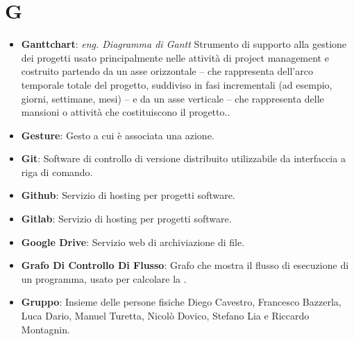 \section{G}
\begin{itemize}
	\item
	\textbf{Ganttchart}: \textit{eng. Diagramma di Gantt} Strumento di supporto alla gestione dei progetti usato principalmente nelle attività di project management e costruito partendo da un asse orizzontale -- che rappresenta dell'arco temporale totale del progetto, suddiviso in fasi incrementali (ad esempio, giorni, settimane, mesi) -- e da un asse verticale -- che rappresenta delle mansioni o attività che costituiscono il progetto..
	\item
	\textbf{Gesture}: Gesto a cui è associata una azione.
	\item
	\textbf{Git}: Software di controllo di versione distribuito utilizzabile da interfaccia a riga di comando.
	\item
	\textbf{Github}: Servizio di hosting per progetti software.
	\item
	\textbf{Gitlab}: Servizio di hosting per progetti software.
	\item
	\textbf{Google Drive}: Servizio web di archiviazione di file.
	\item
	\textbf{Grafo Di Controllo Di Flusso}: Grafo che mostra il flusso di esecuzione di un programma, usato per calcolare la .
	\item
	\textbf{Gruppo}: Insieme delle persone fisiche Diego Cavestro, Francesco Bazzerla, Luca Dario, Manuel Turetta, Nicolò Dovico, Stefano Lia e Riccardo Montagnin.
\end{itemize}
\newpage